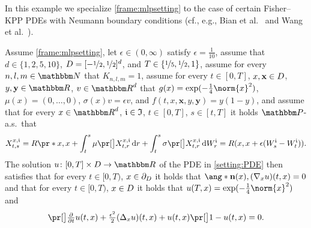 \begin{example}
	\label{exampleMLP:fisherkpp_neumann}
	In this example we specialize \cref{frame:mlpsetting} to the case of certain Fisher--KPP PDEs with Neumann boundary conditions (cf., e.g., Bian et al.~\cite{Bian2017} and Wang et al.~\cite{Wang2021}).
	
	Assume 
		\cref{frame:mlpsetting},
	let
		$\epsilon\in(0,\infty)$
	satisfy
		$\epsilon = \tfrac{1}{10}$,
	assume that
		$d\in\{1,2,5,10\}$,
		$D = [-\nicefrac{1}{2},\nicefrac{1}{2}]^d$, and
		$T\in\{\nicefrac{1}{5},\nicefrac{1}{2},1\}$,
	assume 
		for every 
			$n,l,m\in \N$ 
		that
			$K_{n,l,m} = 1$,
	assume for every 
		$t \in [0,T]$,
		$x,\mathbf{x} \in D$,
		$y,\mathbf{y} \in \R$,
		$v \in \R^d$ 
	that
		$g(x)= \exp (- \tfrac{1}{4}\norm{x}^2)$,
		$\mu(x)=(0,\dots,0)$, 
		$\sigma(x) v = \epsilon v$, and
		$f(t,x,\mathbf{x},y,\mathbf{y})= y(1-y)$,
	and	assume that for every 
		$x\in \R^{d}$, 
		$\mathfrak{i} \in \mathfrak{I}$, 
		$t\in [0,T]$, 
		$s\in [t,T]$ 
	it holds $\P$-a.s.\ that
	\begin{equation}
		X^{x,\dindex}_{t,s} 
		= 
		R\pr*{x,x + \int_{t}^{s} \mu\bpr{X^{x,\dindex}_{t,r}} \, \diff r + \int^{s}_{t} \sigma \bpr{X^{x,\dindex}_{t,r}} \, \diff W^{\dindex}_{r} }
		=
		R(x,x+\epsilon(W^\dindex_s-W^\dindex_t))
		.
	\end{equation}
	The solution 
		$u\colon[0,T]\times \D \to \R$ 
	of the PDE in \eqref{setting:PDE} then satisfies that 
		for every
			$t\in [0,T)$, $x\in\partial_D$
		it holds that
			$\ang*{\mathbf{n}(x) ,(\nabla_x u)(t,x)} = 0$
		and that for every
			$t\in [0,T)$, $x\in D$
		it holds that
			$u(T,x) = \exp (- \tfrac{1}{4}\norm{x}^2)$ and
			\begin{equation}
				\label{eqMLP:fisherKPP_neumann}
				\bpr{\tfrac{\partial }{\partial t}u} (t,x) 
				+
				\tfrac{\epsilon^2}{2}(\Delta_x u) (t,x) 
				+
				u(t,x)\bpr{1 - u(t,x) }
				=
				0
				.
			\end{equation}
\end{example}

